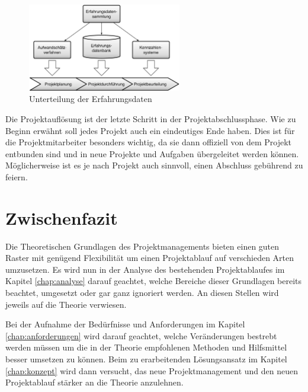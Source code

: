 \begin{figure}[htbp]
\begin{center}
\includegraphics[width=0.6\textwidth,angle=0]{./bilder/theorie/04_unterteilung_erfahrungsdaten.pdf}
\caption[Unterteilung der Erfahrungsdaten]{Unterteilung der Erfahrungsdaten\footnotemark}
\label{pic:04_unterteilung_erfahrungsdaten}
\end{center}
\end{figure}

Die Projektauflösung ist der letzte Schritt in der Projektabschlussphase. Wie 
zu Beginn erwähnt soll jedes Projekt auch ein eindeutiges Ende haben. Dies ist
für die Projektmitarbeiter besonders wichtig, da sie dann offiziell von dem
Projekt entbunden sind und in neue Projekte und Aufgaben übergeleitet werden
können. Möglicherweise ist es je nach Projekt auch sinnvoll, einen Abschluss
gebührend zu feiern.

\section{Zwischenfazit}
Die Theoretischen Grundlagen des Projektmanagements bieten einen guten Raster
mit genügend Flexibilität um einen Projektablauf auf verschieden Arten umzusetzen.
Es wird nun in der Analyse des bestehenden Projektablaufes im Kapitel \ref{chap:analyse}
darauf geachtet, welche Bereiche dieser Grundlagen bereits beachtet, umgesetzt
oder gar ganz ignoriert werden. An diesen Stellen wird jeweils auf die Theorie
verwiesen.

Bei der Aufnahme der Bedürfnisse und Anforderungen im Kapitel \ref{chap:anforderungen} 
wird darauf geachtet, welche Veränderungen bestrebt werden müssen um die in 
der Theorie empfohlenen Methoden und Hilfsmittel besser umsetzen zu können.
Beim zu erarbeitenden Lösungsansatz im Kapitel \ref{chap:konzept} wird dann versucht, 
das neue Projektmanagement und den neuen Projektablauf stärker an die Theorie 
anzulehnen.